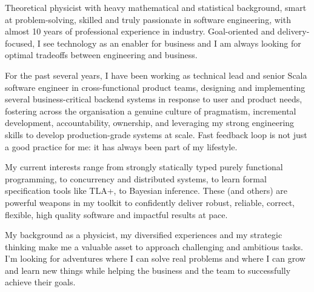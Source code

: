 
\begin{cvparagraph}
Theoretical physicist with heavy mathematical and statistical 
background, smart at problem-solving, skilled and truly passionate in software engineering, with almost 10 years of professional experience in industry. Goal-oriented and delivery-focused, I see technology as an enabler for business and I am always looking for optimal tradeoffs between engineering and business.

  For the past several years, I have been working as technical lead and senior Scala software engineer in cross-functional product teams, designing and implementing several business-critical backend systems in response to user and product needs, fostering  across the organisation a genuine culture of pragmatism, incremental development, accountability, ownership, and leveraging my strong engineering skills 
  to develop production-grade systems at scale. Fast feedback loop is not just a good practice for me: it has always been part of my lifestyle.

  My current interests range from strongly statically typed purely functional programming, to concurrency and distributed systems, to learn formal specification tools like TLA+, to Bayesian inference. These (and others) are powerful weapons in my toolkit to confidently deliver robust, reliable, correct, flexible, high quality software and impactful results at pace. 

My background as a physicist, my diversified experiences and my strategic thinking make me a valuable asset to approach challenging and ambitious tasks. I'm looking for adventures where I can solve real problems and where I can grow and learn new things while helping the business and the team to successfully achieve their goals. 
\end{cvparagraph}
